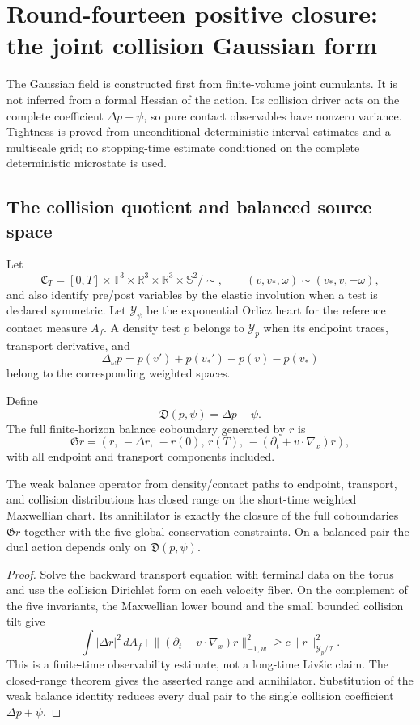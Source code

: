 
\section{Round-fourteen positive closure: the joint collision Gaussian form}
\label{sec:r14-b3}

The Gaussian field is constructed first from finite-volume joint cumulants.
It is not inferred from a formal Hessian of the action.  Its collision driver
acts on the complete coefficient \(\Delta p+\psi\), so pure contact
observables have nonzero variance.  Tightness is proved from unconditional
deterministic-interval estimates and a multiscale grid; no stopping-time
estimate conditioned on the complete deterministic microstate is used.

\subsection{The collision quotient and balanced source space}

Let
\[
 \mathfrak C_T=
 [0,T]\times\mathbb T^3\times\mathbb R^3\times\mathbb R^3
 \times\mathbb S^2/\!\sim ,
\qquad
 (v,v_*,\omega)\sim(v_*,v,-\omega),
\]
and also identify pre/post variables by the elastic involution when a test is
declared symmetric.  Let \(\mathcal Y_\psi\) be the exponential Orlicz heart
for the reference contact measure \(A_f\).  A density test \(p\) belongs to
\(\mathcal Y_p\) when its endpoint traces, transport derivative, and
\[
 \Delta_\omega p
 =p(v')+p(v_*')-p(v)-p(v_*)
\]
belong to the corresponding weighted spaces.

Define
\[
 \mathfrak D(p,\psi)=\Delta p+\psi.
\]
The full finite-horizon balance coboundary generated by \(r\) is
\[
 \mathfrak G r=
 \left(
 r,\,-\Delta r,\,
 -r(0),\,r(T),\,
 -(\partial_t+v\cdot\nabla_x)r
 \right),
\]
with all endpoint and transport components included.

\begin{theorem}
\label{thm:r14-b3-gauge}
The weak balance operator from density/contact paths to endpoint, transport,
and collision distributions has closed range on the short-time weighted
Maxwellian chart.  Its annihilator is exactly the closure of the full
coboundaries \(\mathfrak G r\) together with the five global conservation
constraints.  On a balanced pair the dual action depends only on
\(\mathfrak D(p,\psi)\).
\end{theorem}

\begin{proof}
Solve the backward transport equation with terminal data on the torus and
use the collision Dirichlet form on each velocity fiber.  On the complement
of the five invariants, the Maxwellian lower bound and the small bounded
collision tilt give
\[
 \int|\Delta r|^2\,dA_f
 +\|(\partial_t+v\cdot\nabla_x)r\|_{-1,w}^2
 \ge c\|r\|_{\mathcal Y_p/\mathcal I}^2 .
\]
This is a finite-time observability estimate, not a long-time Liv\v{s}ic
claim.  The closed-range theorem gives the asserted range and annihilator.
Substitution of the weak balance identity reduces every dual pair to the
single collision coefficient \(\Delta p+\psi\).
\end{proof}

